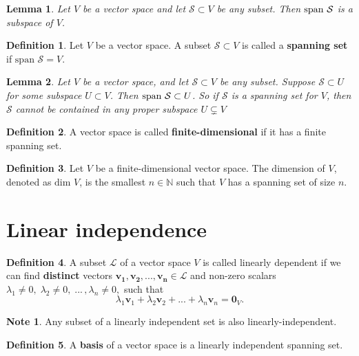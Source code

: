 \documentclass[11pt,a4paper]{article}
\newcommand\N{\mathbb{N}}
\newcommand\Sf{\mathcal{S}}
\newtheorem{lemma}{Lemma}
\theoremstyle{definition}
\newtheorem{definition}{Definition}
\newtheorem{note}{Note}
\begin{document}
\begin{lemma}
    Let $ V $ be a vector space and let $ \mathcal{S} \subset V $ be any subset. Then $ \textup{span } \mathcal{S} $ is a subspace of $ V $.
\end{lemma}

\begin{definition}
    Let $ V $ be a vector space. A subset $ \mathcal{S} \subset V $ is called a \textbf{spanning set} if $ \text{span } \mathcal{S} = V $.
\end{definition}

\begin{lemma}
    Let $ V $ be a vector space, and let $ \Sf \subset V$ be any subset. Suppose $ \Sf \subset U $ for some subspace $ U \subset V $. Then $\textup{span } \Sf \subset U $. 
    So if $ \Sf $ is a spanning set for $ V $, then $ \Sf $ cannot be contained in any proper subspace $ U \subsetneq V$
\end{lemma}

\begin{definition}
    A vector space is called \textbf{finite-dimensional} if it has a finite spanning set. 
\end{definition}

\begin{definition}
    Let $ V $ be a finite-dimensional vector space. The dimension of $ V $, denoted as $ \text{dim } V $, is the smallest $ n \in \N $ such that $ V $ has a spanning set of size $ n $.
\end{definition}

\section{Linear independence}

\begin{definition}
    A subset $ \mathcal{L} $ of a vector space $ V $ is called linearly dependent if we can find \textbf{distinct} vectors $ \mathbf{v_1}, \mathbf{v_2}, ..., \mathbf{v_n} \in \mathcal{L} $
    and non-zero scalars $ \lambda_1 \neq 0,\; \lambda_2 \neq 0, \; ... \, ,\lambda_n \neq 0, $ such that  
    \[ \lambda_1\mathbf{v}_1 +\lambda_2\mathbf{v}_2 + ... + \lambda_n\mathbf{v}_n = \mathbf{0}_V. \]
\end{definition}
\begin{note}
    Any subset of a linearly independent set is also linearly-independent.
\end{note}

\begin{definition}
    A \textbf{basis} of a vector space is a linearly independent spanning set.
\end{definition}
\end{document}
